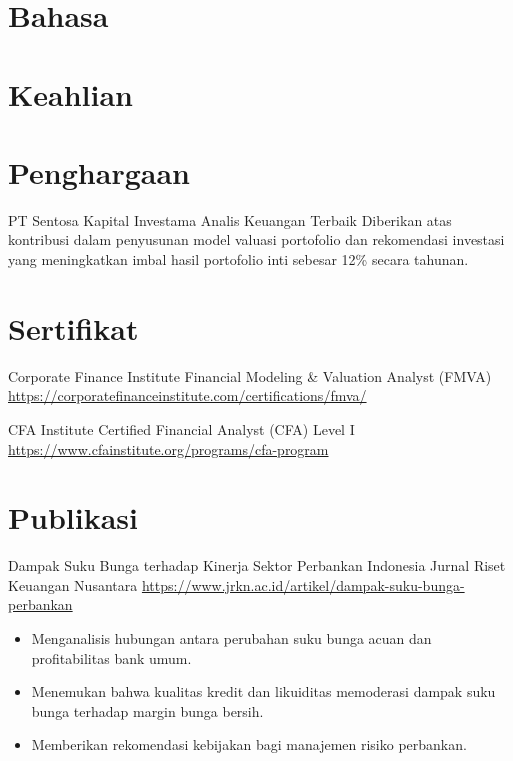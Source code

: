 \documentclass[a4paper, serif, 10pt]{moderncv}
\begin{document}
\section{Bahasa}

\section{Keahlian}

\section{Penghargaan}

        {PT Sentosa Kapital Investama}
        {Analis Keuangan Terbaik}
        {}
        {}
        {Diberikan atas kontribusi dalam penyusunan model valuasi portofolio dan rekomendasi investasi yang meningkatkan imbal hasil portofolio inti sebesar 12\% secara tahunan.}
\section{Sertifikat}

        {Corporate Finance Institute}
        {Financial Modeling \& Valuation Analyst (FMVA)}
        {\url{https://corporatefinanceinstitute.com/certifications/fmva/}}
        {}
        {}

        {CFA Institute}
        {Certified Financial Analyst (CFA) Level I}
        {\url{https://www.cfainstitute.org/programs/cfa-program}}
        {}
        {}
\section{Publikasi}

        {Dampak Suku Bunga terhadap Kinerja Sektor Perbankan Indonesia}
        {Jurnal Riset Keuangan Nusantara}
        {\url{https://www.jrkn.ac.id/artikel/dampak-suku-bunga-perbankan}}
        {}
        {\begin{itemize}
\item Menganalisis hubungan antara perubahan suku bunga acuan dan profitabilitas bank umum.
\item Menemukan bahwa kualitas kredit dan likuiditas memoderasi dampak suku bunga terhadap margin bunga bersih.
\item Memberikan rekomendasi kebijakan bagi manajemen risiko perbankan.
\end{itemize}}
\end{document}
